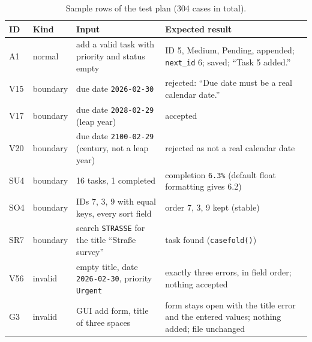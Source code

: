\documentclass[11pt,a4paper]{article}
\newcommand{\code}[1]{\texttt{#1}}
\begin{document}
\begin{table}[ht]
\centering
\footnotesize
\begin{tabularx}{\textwidth}{@{}llXX@{}}
\toprule
ID & Kind & Input & Expected result \\
\midrule
A1 & normal & add a valid task with priority and status empty & ID 5, Medium, Pending, appended; \code{next\_id} 6; saved; \enquote{Task 5 added.} \\
V15 & boundary & due date \code{2026-02-30} & rejected: \enquote{Due date must be a real calendar date.} \\
V17 & boundary & due date \code{2028-02-29} (leap year) & accepted \\
V20 & boundary & due date \code{2100-02-29} (century, not a leap year) & rejected as not a real calendar date \\
SU4 & boundary & 16 tasks, 1 completed & completion \code{6.3\%} (default float formatting gives 6.2) \\
SO4 & boundary & IDs 7, 3, 9 with equal keys, every sort field & order 7, 3, 9 kept (stable) \\
SR7 & boundary & search \code{STRASSE} for the title \enquote{Straße survey} & task found (\code{casefold()}) \\
V56 & invalid & empty title, date \code{2026-02-30}, priority \code{Urgent} & exactly three errors, in field order; nothing accepted \\
G3 & invalid & GUI add form, title of three spaces & form stays open with the title error and the entered values; nothing added; file unchanged \\
\bottomrule
\end{tabularx}
\caption{Sample rows of the test plan (304 cases in total).}
\label{tab:cases}
\end{table}
\end{document}
